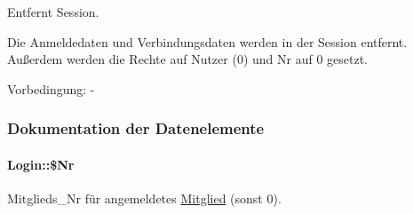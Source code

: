 Entfernt Session. 

Die Anmeldedaten und Verbindungsdaten werden in der Session entfernt. Außerdem werden die Rechte auf Nutzer (0) und Nr auf 0 gesetzt. \begin{Desc}
\item[Vorbedingung:]- \end{Desc}


\subsubsection{Dokumentation der Datenelemente}
\hypertarget{classLogin_227dede2a7c9c25b1e103b32de62d4df}{
\paragraph[\$Nr]{\setlength{\rightskip}{0pt plus 5cm}Login::\$Nr}\hfill}
\label{classLogin_227dede2a7c9c25b1e103b32de62d4df}


Mitglieds\_\-Nr für angemeldetes \hyperlink{classMitglied}{Mitglied} (sonst 0). 

